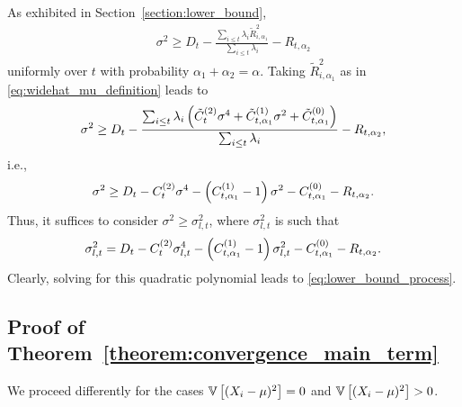 As exhibited in Section~\ref{section:lower_bound},
\begin{align*}
    \sigma^2 \geq D_t - \frac{\sum_{i \leq t}\lambda_i \tilde R_{i, \alpha_1}^2}{\sum_{i \leq t} \lambda_i} -  R_{t, \alpha_2}
\end{align*}
uniformly over $t$ with probability $\alpha_1 + \alpha_2 = \alpha$. Taking $\tilde R_{i, \alpha_1}^2$ as in \eqref{eq:widehat_mu_definition} leads to 
\begin{align*}
    \sigma^2 \geq D_t - \frac{\sum_{i \leq t}\lambda_i \left( \tilde C^{(2)}_t \sigma^4 + \tilde C^{(1)}_{t, \alpha_1} \sigma^2 + \tilde C^{(0)}_{t, \alpha_1}\right) }{\sum_{i \leq t} \lambda_i} -  R_{t, \alpha_2},
\end{align*}
i.e.,
\begin{align*}
    \sigma^2 \geq D_t - C^{(2)}_t \sigma^4 - \left( C^{(1)}_{t, \alpha_1} - 1 \right) \sigma^2 - C^{(0)}_{t, \alpha_1} -  R_{t, \alpha_2}.
\end{align*}
Thus, it suffices to consider $\sigma^2 \geq \sigma^2_{l, t}$, where $\sigma^2_{l, t}$ is such that
\begin{align*}
   \sigma^2_{l, t} = D_t - C^{(2)}_t \sigma^4_{l, t} - \left( C^{(1)}_{t, \alpha_1} - 1 \right) \sigma^2_{l, t} - C^{(0)}_{t, \alpha_1} -  R_{t, \alpha_2}.
\end{align*}
Clearly, solving for this quadratic polynomial leads to \eqref{eq:lower_bound_process}.  



\subsection{Proof of Theorem~\ref{theorem:convergence_main_term}} \label{proof:convergence_main_term}

We proceed differently for the cases $\mathbb{V} \left[ (X_i-\mu)^2\right] = 0$ and $\mathbb{V} \left[ (X_i-\mu)^2\right] > 0$.

